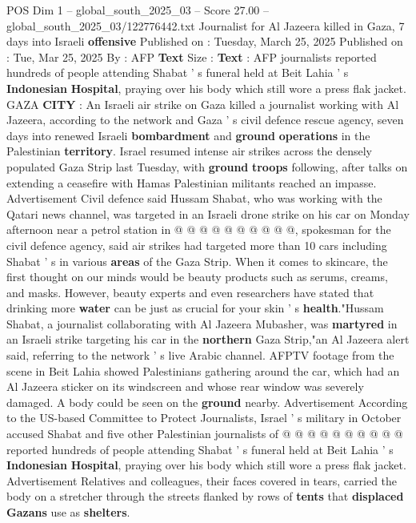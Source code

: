 \begin{textsample}{POS Dim 1 – global\_south\_2025\_03 – Score 27.00 – global\_south\_2025\_03/122776442.txt}  \label{ex:f1_pos_270}
Journalist for Al Jazeera killed in Gaza, 7 days into Israeli \textbf{offensive} Published on : Tuesday, March 25, 2025 Published on : Tue, Mar 25, 2025 By : AFP \textbf{Text} Size : \textbf{Text} : AFP journalists reported hundreds of people attending Shabat ' s funeral held at Beit Lahia ' s \textbf{Indonesian} \textbf{Hospital}, praying over his body which still wore a press flak jacket.
GAZA \textbf{CITY} : An Israeli air strike on Gaza killed a journalist working with Al Jazeera, according to the network and Gaza ' s civil defence rescue agency, seven days into renewed Israeli \textbf{bombardment} and \textbf{ground} \textbf{operations} in the Palestinian \textbf{territory}.
Israel resumed intense air strikes across the densely populated Gaza Strip last Tuesday, with \textbf{ground} \textbf{troops} following, after talks on extending a ceasefire with Hamas Palestinian militants reached an impasse.
Advertisement Civil defence said Hussam Shabat, who was working with the Qatari news channel, was targeted in an Israeli drone strike on his car on Monday afternoon near a petrol station in @ @ @ @ @ @ @ @ @ @, spokesman for the civil defence agency, said air strikes had targeted more than 10 cars including Shabat ' s in various \textbf{areas} of the Gaza Strip.
When it comes to skincare, the first thought on our minds would be beauty products such as serums, creams, and masks.
However, beauty experts and even researchers have stated that drinking more \textbf{water} can be just as crucial for your skin ' s \textbf{health}."Hussam Shabat, a journalist collaborating with Al Jazeera Mubasher, was \textbf{martyred} in an Israeli strike targeting his car in the \textbf{northern} Gaza Strip,"an Al Jazeera alert said, referring to the network ' s live Arabic channel.
AFPTV footage from the scene in Beit Lahia showed Palestinians gathering around the car, which had an Al Jazeera sticker on its windscreen and whose rear window was severely damaged.
A body could be seen on the \textbf{ground} nearby.
Advertisement According to the US-based Committee to Protect Journalists, Israel ' s military in October accused Shabat and five other Palestinian journalists of @ @ @ @ @ @ @ @ @ @ reported hundreds of people attending Shabat ' s funeral held at Beit Lahia ' s \textbf{Indonesian} \textbf{Hospital}, praying over his body which still wore a press flak jacket.
Advertisement Relatives and colleagues, their faces covered in tears, carried the body on a stretcher through the streets flanked by rows of \textbf{tents} that \textbf{displaced} \textbf{Gazans} use as \textbf{shelters}.

\end{textsample}
